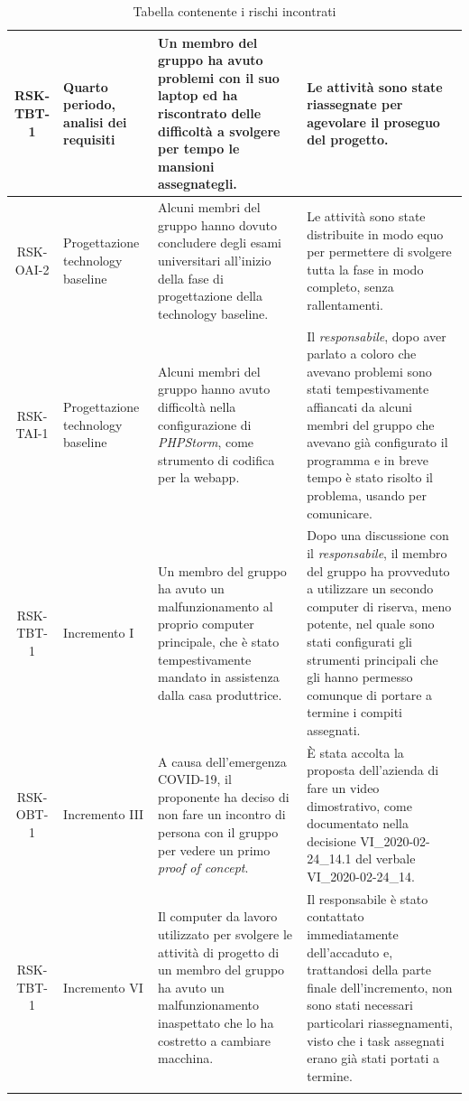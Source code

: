 \begin{center}
\begin{longtable}{|c|p{3cm}|p{4cm}|p{4cm}|}
			\hline
			RSK-TBT-1 & Quarto periodo, analisi dei requisiti & Un membro del gruppo ha avuto problemi con il suo laptop ed ha riscontrato delle difficoltà a svolgere per tempo le mansioni assegnategli. & Le attività sono state riassegnate per agevolare il proseguo del progetto. \\
			\hline
			RSK-OAI-2 & Progettazione technology baseline &Alcuni membri del gruppo hanno dovuto concludere degli esami universitari all'inizio della fase di progettazione della technology baseline. & Le attività sono state distribuite in modo equo per permettere di svolgere tutta la fase in modo completo, senza rallentamenti. \\
			\hline
			RSK-TAI-1 & Progettazione technology baseline &Alcuni membri del gruppo hanno avuto difficoltà nella configurazione di \textit{PHPStorm}, come strumento di codifica per la webapp. & Il \textit{responsabile}, dopo aver parlato a coloro che avevano problemi sono stati tempestivamente affiancati da alcuni membri del gruppo che avevano già configurato il programma e in breve tempo è stato risolto il problema, usando \glock{Discord} per comunicare. \\
			\hline
			RSK-TBT-1 & Incremento I & Un membro del gruppo ha avuto un malfunzionamento al proprio computer principale, che è stato tempestivamente mandato in assistenza dalla casa produttrice. & Dopo una discussione con il \textit{responsabile}, il membro del gruppo ha provveduto a utilizzare un secondo computer di riserva, meno potente, nel quale sono stati configurati gli strumenti principali che gli hanno permesso comunque di portare a termine i compiti assegnati. \\
			\hline
			RSK-OBT-1 & Incremento III & A causa dell'emergenza COVID-19, il proponente ha deciso di non fare un incontro di persona con il gruppo per vedere un primo \textit{proof of concept}. & È stata accolta la proposta dell'azienda di fare un video dimostrativo, come documentato nella decisione VI\_2020-02-24\_14.1 del verbale VI\_2020-02-24\_14. \\
			\hline
			RSK-TBT-1 & Incremento VI & Il computer da lavoro utilizzato per svolgere le attività di progetto di un membro del gruppo ha avuto un malfunzionamento inaspettato che lo ha costretto a cambiare macchina. & Il responsabile è stato contattato immediatamente dell'accaduto e, trattandosi della parte finale dell'incremento, non sono stati necessari particolari riassegnamenti, visto che i task assegnati erano già stati portati a termine. \\
			\hline

			\caption{Tabella contenente i rischi incontrati}
			\end{longtable}
		\end{center}

